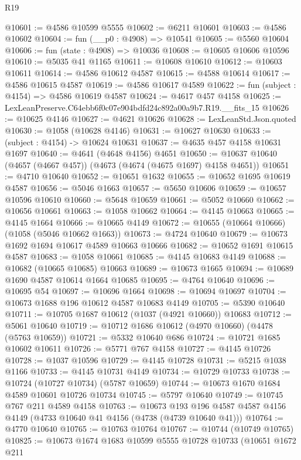 \begin{lexlean}{R19}
\begin{coremodule}
@10601 := @4586 @10599 @5555
@10602 := @6211 @10601
@10603 := @4586 @10602
@10604 := fun (__p0 : @4908) => @10541
@10605 := @5560 @10604
@10606 := fun (state : @4908) => @10036
@10608 := @10605 @10606 @10596
@10610 := @5035 @41 @1165
@10611 := @10608 @10610
@10612 := @10603 @10611
@10614 := @4586 @10612 @4587
@10615 := @4588 @10614
@10617 := @4586 @10615 @4587
@10619 := @4586 @10617 @4589
@10622 := fun (subject : @4154) => @4586 @10619 @4587
@10624 := @4617 @457 @4158
@10625 := LexLeanPreserve.C64ebb6f0c07e904bdfd24c892a00a9b7.R19.__fits_15
@10626 := @10625 @4146
@10627 := @4621 @10626
@10628 := LexLeanStd.Json.quoted
@10630 := @1058 (@10628 @4146)
@10631 := @10627 @10630
@10633 := (subject : @4154) -> @10624 @10631
@10637 := @4635 @457 @4158 @10631 @1697
@10640 := @4641 (@4648 @4156) @4651
@10650 := @10637 @10640 (@4657 (@4667 @457)) (@4673 (@4674 (@4675 @1697) @4158 @4651))
@10651 := @4710 @10640
@10652 := @10651 @1632
@10655 := @10652 @1695 @10619 @4587
@10656 := @5046 @1663
@10657 := @5650 @10606
@10659 := @10657 @10596 @10610
@10660 := @5648 @10659
@10661 := @5052 @10660
@10662 := @10656 @10661
@10663 := @1058 @10662
@10664 := @4145 @10663
@10665 := @4145 @1664
@10666 := @10665 @4149
@10672 := @10655 (@10664 @10666) (@1058 (@5046 @10662 @1663))
@10673 := @4724 @10640
@10679 := @10673 @1692 @1694 @10617 @4589 @10663 @10666
@10682 := @10652 @1691 @10615 @4587
@10683 := @1058 @10661
@10685 := @4145 @10683 @4149
@10688 := @10682 (@10665 @10685) @10663
@10689 := @10673 @1665
@10694 := @10689 @1690 @4587 @10614 @1664 @10685
@10695 := @4764 @10640
@10696 := @10695 @54
@10697 := @10696 @1664
@10698 := @10694 @10697
@10704 := @10673 @1688 @196 @10612 @4587 @10683 @4149
@10705 := @5390 @10640
@10711 := @10705 @1687 @10612 (@1037 (@4921 @10660)) @10683
@10712 := @5061 @10640
@10719 := @10712 @1686 @10612 (@4970 @10660) (@4478 (@5763 @10659))
@10721 := @5332 @10640 @686
@10724 := @10721 @1685 @10602 @10611
@10726 := @5771 @767 @4158
@10727 := @4145 @10726
@10728 := @1037 @10596
@10729 := @4145 @10728
@10731 := @5215 @1038 @1166
@10733 := @4145 @10731 @4149
@10734 := @10729 @10733
@10738 := @10724 (@10727 @10734) (@5787 @10659)
@10744 := @10673 @1670 @1684 @4589 @10601 @10726 @10734
@10745 := @5797 @10640
@10749 := @10745 @767 @211 @4589 @4158
@10763 := @10673
    @193
    @196
    @4587
    @4587
    @4156
    @4149
    (@4733 @10640 @41 @4156 (@4738 (@4739 @10640 @41)))
@10764 := @4770 @10640
@10765 := @10763 @10764
@10767 := @10744 (@10749 @10765)
@10825 := @10673
    @1674
    @1683
    @10599
    @5555
    @10728
    @10733
    (@10651
      @1672
      @211

\end{coremodule}
\end{lexlean}
